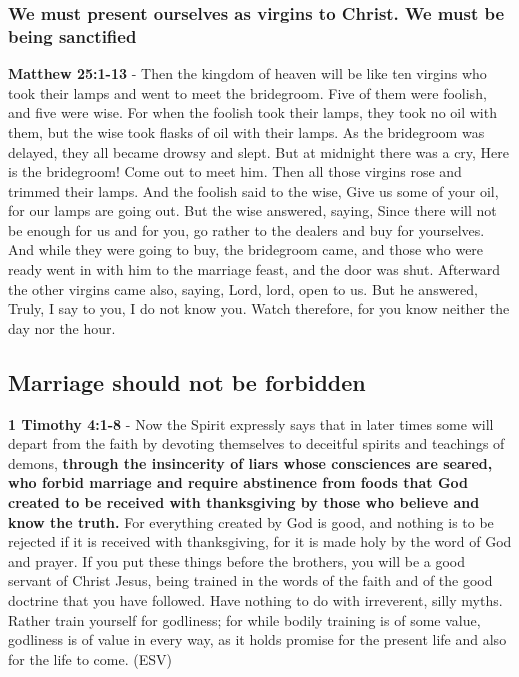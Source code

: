 \documentclass[11pt]{article}
\begin{document}
\subsubsection{We must present ourselves as virgins to Christ. We must be being sanctified}
\label{sec:org4455ef4}
\textbf{Matthew 25:1-13} - Then the kingdom of heaven will be like ten virgins who took their lamps and went to meet the bridegroom. Five of them were foolish, and five were wise. For when the foolish took their lamps, they took no oil with them, but the wise took flasks of oil with their lamps. As the bridegroom was delayed, they all became drowsy and slept. But at midnight there was a cry, Here is the bridegroom! Come out to meet him. Then all those virgins rose and trimmed their lamps. And the foolish said to the wise, Give us some of your oil, for our lamps are going out. But the wise answered, saying, Since there will not be enough for us and for you, go rather to the dealers and buy for yourselves. And while they were going to buy, the bridegroom came, and those who were ready went in with him to the marriage feast, and the door was shut. Afterward the other virgins came also, saying, Lord, lord, open to us. But he answered, Truly, I say to you, I do not know you. Watch therefore, for you know neither the day nor the hour.

\subsection{Marriage should not be forbidden}
\label{sec:orga1dbbcc}
\textbf{1 Timothy 4:1-8} - Now the Spirit expressly says that in later times some will depart from the faith by devoting themselves to deceitful spirits and teachings of demons, \textbf{through the insincerity of liars whose consciences are seared, who forbid marriage and require abstinence from foods that God created to be received with thanksgiving by those who believe and know the truth.} For everything created by God is good, and nothing is to be rejected if it is received with thanksgiving, for it is made holy by the word of God and prayer. If you put these things before the brothers, you will be a good servant of Christ Jesus, being trained in the words of the faith and of the good doctrine that you have followed. Have nothing to do with irreverent, silly myths. Rather train yourself for godliness; for while bodily training is of some value, godliness is of value in every way, as it holds promise for the present life and also for the life to come. (ESV)
\end{document}
